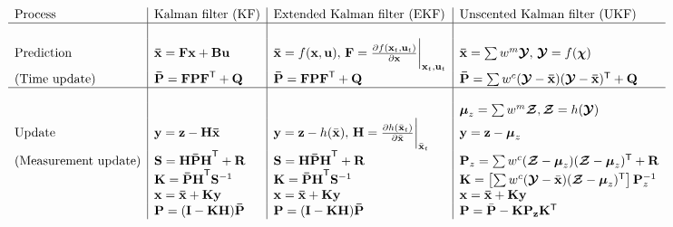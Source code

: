 \documentclass[border=0.2cm]{standalone}
\begin{document}
\color{black}
$\begin{array}{l|l|l|l}
\text{Process}                      &
\text{Kalman filter (KF)}           & 
\text{Extended Kalman filter (EKF)} & 
\text{Unscented Kalman filter (UKF)} \\

\hline 
& & & \\

\text{Prediction} &
\mathbf{\bar x} = \mathbf{Fx} + \mathbf{Bu} & 
\mathbf{\bar x} = f(\mathbf x, \mathbf u),\, \mathbf F = {\frac{\partial{f(\mathbf x_t, \mathbf u_t)}}{\partial{\mathbf x}}}\biggr|_{{\mathbf x_t},{\mathbf u_t}} & 
\mathbf{\bar x} = \sum w^m\boldsymbol{\mathcal Y},\, \boldsymbol{\mathcal Y} = f(\boldsymbol\chi) \\

\text{(Time update)} &
\mathbf{\bar P} = \mathbf{FPF}^\mathsf{T}+\mathbf Q  & 
\mathbf{\bar P} = \mathbf{FPF}^\mathsf{T}+\mathbf Q  &
\mathbf{\bar P} = \sum w^c(\boldsymbol{\mathcal Y} - \mathbf{\bar x})(\boldsymbol{\mathcal Y} - \mathbf{\bar x})^\mathsf T+\mathbf Q \\

\hline
& & & \\

& & & \boldsymbol\mu_z = \sum w^m\boldsymbol{\mathcal{Z}}, \boldsymbol{\mathcal Z} =  h(\boldsymbol{\mathcal{Y}}) \\

\text{Update} &
\textbf{y} = \mathbf z - \mathbf{H \bar{x}} & 
\textbf{y} = \mathbf z - h(\bar{\mathbf x}),\, \mathbf H = \frac{\partial{h(\bar{\mathbf x}_t)}}{\partial{\bar{\mathbf x}}}\biggr|_{\bar{\mathbf x}_t} &
\mathbf y = \mathbf z - \boldsymbol\mu_z \\

\text{(Measurement update)} &
\mathbf S = \mathbf{H\bar PH}^\mathsf{T} + \mathbf R & 
\mathbf S = \mathbf{H\bar PH}^\mathsf{T} + \mathbf R & 
\mathbf P_z = \sum w^c{(\boldsymbol{\mathcal Z}-\boldsymbol\mu_z)(\boldsymbol{\mathcal{Z}}-\boldsymbol\mu_z)^\mathsf{T}} + \mathbf R \\

& 
\mathbf K = \mathbf{\bar PH}^\mathsf T \mathbf S^{-1} & 
\mathbf K = \mathbf{\bar PH}^\mathsf T \mathbf S^{-1} &
\mathbf K = \left[\sum w^c(\boldsymbol{\mathcal Y}-\bar{\mathbf x})(\boldsymbol{\mathcal{Z}}-\boldsymbol\mu_z)^\mathsf{T}\right] \mathbf P_z^{-1} \\

&
\mathbf x = \mathbf{\bar x} + \mathbf{Ky} & 
\mathbf x = \mathbf{\bar x} + \mathbf{Ky} &
\mathbf x = \mathbf{\bar x} + \mathbf{Ky} \\

&
\mathbf P= (\mathbf{I}-\mathbf{KH})\mathbf{\bar{P}} & 
\mathbf P= (\mathbf{I}-\mathbf{KH})\mathbf{\bar{P}} &
\mathbf P = \bar{\mathbf P} - \mathbf{KP_z}\mathbf{K}^\mathsf{T}
\end{array}$
\end{document}
